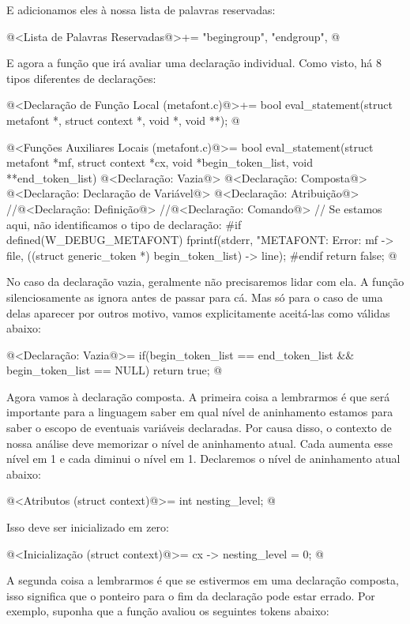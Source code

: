 E adicionamos eles à nossa lista de palavras reservadas:

\iniciocodigo
@<Lista de Palavras Reservadas@>+=
"begingroup", "endgroup",
@
\fimcodigo

E agora a função que irá avaliar uma declaração individual. Como
visto, há 8 tipos diferentes de declarações:

\iniciocodigo
@<Declaração de Função Local (metafont.c)@>+=
bool eval_statement(struct metafont *, struct context *, void *, void **);
@
\fimcodigo

\iniciocodigo
@<Funções Auxiliares Locais (metafont.c)@>=
bool eval_statement(struct metafont *mf, struct context *cx,
                     void *begin_token_list, void **end_token_list){
  @<Declaração: Vazia@>
  @<Declaração: Composta@>
  @<Declaração: Declaração de Variável@>
  @<Declaração: Atribuição@>
  //@<Declaração: Definição@>
  //@<Declaração: Comando@>
  // Se estamos aqui, não identificamos o tipo de declaração:
#if defined(W_DEBUG_METAFONT)
    fprintf(stderr, "METAFONT: Error: %
            mf -> file,
            ((struct generic_token *) begin_token_list) -> line);
#endif
  return false;
}
@
\fimcodigo

No caso da declaração vazia, geralmente não precisaremos lidar com
ela. A função  silenciosamente
as ignora antes de passar para cá. Mas só para o caso de uma delas
aparecer por outros motivo, vamos explicitamente aceitá-las como
válidas abaixo:

\iniciocodigo
@<Declaração: Vazia@>=
if(begin_token_list == end_token_list && begin_token_list == NULL)
  return true;
@
\fimcodigo

Agora vamos à declaração composta. A primeira coisa a lembrarmos é que
será importante para a linguagem saber em qual nível de aninhamento
estamos para saber o escopo de eventuais variáveis declaradas. Por
causa disso, o contexto de nossa análise deve memorizar o nível de
aninhamento atual. Cada  aumenta esse nível em
1 e cada  diminui o nível em 1. Declaremos o
nível de aninhamento atual abaixo:

\iniciocodigo
@<Atributos (struct context)@>=
  int nesting_level;
@
\fimcodigo

Isso deve ser inicializado em zero:

\iniciocodigo
@<Inicialização (struct context)@>=
  cx -> nesting_level = 0;
@
\fimcodigo

A segunda coisa a lembrarmos é que se estivermos em uma declaração
composta, isso significa que o ponteiro para o fim da declaração pode
estar errado. Por exemplo, suponha que a função
 avaliou os seguintes tokens
abaixo:

